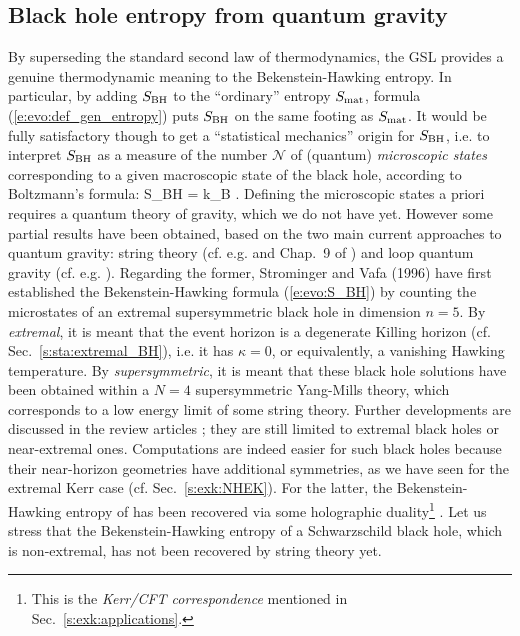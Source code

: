 \subsection{Black hole entropy from quantum gravity}

By superseding the standard second law of thermodynamics, the GSL provides a
genuine thermodynamic meaning to the Bekenstein-Hawking entropy.
In particular, by adding $S_{\rm BH}$ to the ``ordinary'' entropy $S_{\rm mat}$, formula (\ref{e:evo:def_gen_entropy})
puts $S_{\rm BH}$ on the same footing as $S_{\rm mat}$. It would be fully satisfactory though to
get a ``statistical mechanics'' origin for $S_{\rm BH}$, i.e. to interpret $S_{\rm BH}$
as a measure of the number $\mathscr{N}$ of (quantum) \emph{microscopic states} corresponding to a given macroscopic
state of the black hole, according to Boltzmann's formula:
\be
    S_{\rm BH} = k_{\rm B} \ln {}.
\ee
Defining the microscopic states a priori requires a quantum theory of gravity, which we do not have yet. However some partial results have been
obtained, based on the two main current approaches to quantum gravity: string theory
(cf. e.g. \cite{Peet01} and Chap.~9 of \cite{GrumiS22})
and loop quantum gravity (cf. e.g. \cite{Perez17,Rovel04}). Regarding the former, Strominger and Vafa (1996) \cite{StromV96} have first established
the Bekenstein-Hawking formula (\ref{e:evo:S_BH}) by counting the microstates
of an extremal supersymmetric black hole in dimension $n=5$. By \emph{extremal}, it is meant
that the event horizon is a degenerate Killing horizon
(cf. Sec.~\ref{s:sta:extremal_BH}), i.e. it has $\kappa=0$, or equivalently,
a vanishing Hawking temperature. By \emph{supersymmetric}, it is meant that these black hole
solutions have been obtained within a $N=4$ supersymmetric Yang-Mills theory,
which corresponds to a low energy limit of some string theory. Further developments are
discussed in the review articles \cite{Carli14,Damou04,Horow98,Wald01,Walla19,Zaffa20}; they are
still limited to extremal black holes or near-extremal ones.
Computations are indeed easier for such black holes because their near-horizon geometries
have additional symmetries, as we have seen for the extremal Kerr case
(cf. Sec.~\ref{s:exk:NHEK}). For the latter, the Bekenstein-Hawking entropy of
has been recovered via some
holographic duality\footnote{This is the \emph{Kerr/CFT correspondence}
mentioned in Sec.~\ref{s:exk:applications}.} \cite{GuicaHSS09,Compe17}.
Let us stress that the Bekenstein-Hawking entropy of a Schwarzschild black hole, which is non-extremal,
has not been recovered by string theory yet.

